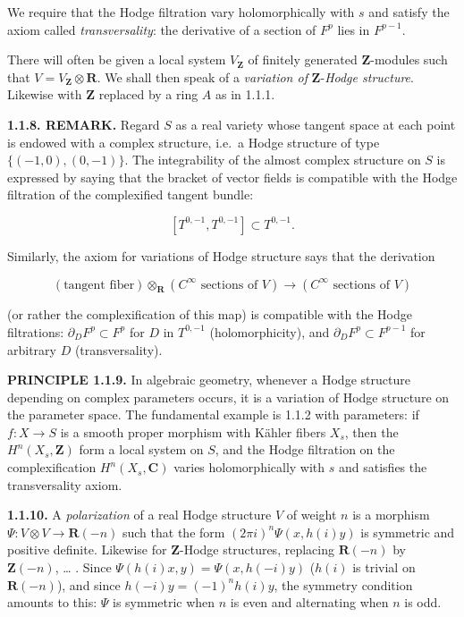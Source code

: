 \documentclass[10pt,a4paper]{article}
\begin{document}
We require that the Hodge filtration vary holomorphically with \(s\) and satisfy the axiom called \emph{transversality}: the derivative of a section of \(F^p\) lies in \(F^{p-1}\).

There will often be given a local system \(V_{\mathbf Z}\) of finitely generated \(\mathbf Z\)-modules such that \(V=V_{\mathbf Z}\otimes\mathbf R\). We shall then speak of a \emph{variation of} \(\mathbf Z\)-\emph{Hodge structure}. Likewise with \(\mathbf Z\) replaced by a ring \(A\) as in 1.1.1.

\textbf{1.1.8. REMARK.} Regard \(S\) as a real variety whose tangent space at each point is endowed with a complex structure, i.e.~a Hodge structure of type \(\{(-1,0),(0,-1)\}\). The integrability of the almost complex structure on \(S\) is expressed by saying that the bracket of vector fields is compatible with the Hodge filtration of the complexified tangent bundle:

\[
[T^{0,-1},T^{0,-1}]\subset T^{0,-1}.
\]

Similarly, the axiom for variations of Hodge structure says that the derivation

\[
(\text{tangent fiber})\otimes_{\mathbf R}(C^\infty\text{ sections of }V)
\longrightarrow
(C^\infty\text{ sections of }V)
\]

(or rather the complexification of this map) is compatible with the Hodge filtrations: \(\partial_DF^p\subset F^p\) for \(D\) in \(T^{0,-1}\) (holomorphicity), and \(\partial_DF^p\subset F^{p-1}\) for arbitrary \(D\) (transversality).

\textbf{PRINCIPLE 1.1.9.} In algebraic geometry, whenever a Hodge structure depending on complex parameters occurs, it is a variation of Hodge structure on the parameter space. The fundamental example is 1.1.2 with parameters: if \(f:X\to S\) is a smooth proper morphism with Kähler fibers \(X_s\), then the \(H^n(X_s,\mathbf Z)\) form a local system on \(S\), and the Hodge filtration on the complexification \(H^n(X_s,\mathbf C)\) varies holomorphically with \(s\) and satisfies the transversality axiom.

\textbf{1.1.10.} A \emph{polarization} of a real Hodge structure \(V\) of weight \(n\) is a morphism \(\Psi:V\otimes V\to\mathbf R(-n)\) such that the form \((2\pi i)^n\Psi(x,h(i)y)\) is symmetric and positive definite. Likewise for \(\mathbf Z\)-Hodge structures, replacing \(\mathbf R(-n)\) by \(\mathbf Z(-n)\), \ldots{} . Since \(\Psi(h(i)x,y)=\Psi(x,h(-i)y)\) (\(h(i)\) is trivial on \(\mathbf R(-n)\)), and since \(h(-i)y=(-1)^nh(i)y\), the symmetry condition amounts to this: \(\Psi\) is symmetric when \(n\) is even and alternating when \(n\) is odd.
\end{document}
